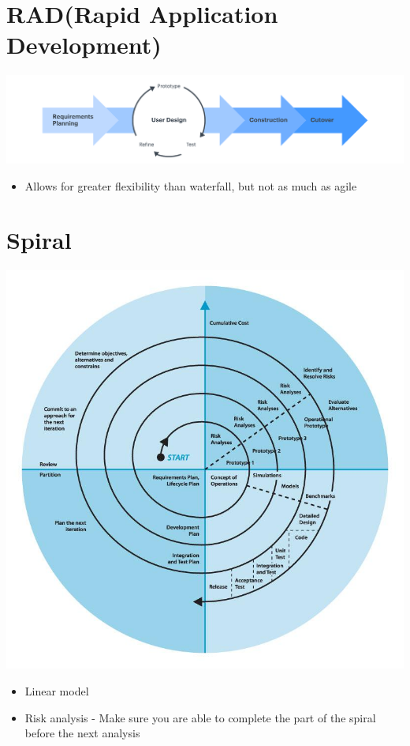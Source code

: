 \documentclass{article}[18pt]
\begin{document}
\section{RAD(Rapid Application Development)}
\begin{center}
	\includegraphics[scale=0.7]{RAD}
\end{center}
\begin{itemize}
	\item Allows for greater flexibility than waterfall, but not as much as agile
\end{itemize}


\section{Spiral}

\begin{center}
	\includegraphics[scale=0.7]{Spiral}
\end{center}
\begin{itemize}
	\item Linear model
	\item Risk analysis - Make sure you are able to complete the part of the spiral before the next analysis 
\end{itemize}
\end{document}
